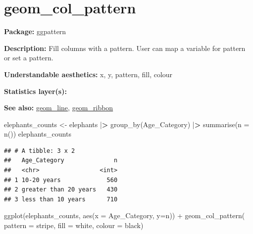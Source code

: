 \documentclass[
]{book}
\newenvironment{Shaded}{\begin{snugshade}}{\end{snugshade}}
\newcommand{\AttributeTok}[1]{\textcolor[rgb]{0.77,0.63,0.00}{#1}}
\newcommand{\ErrorTok}[1]{\textcolor[rgb]{0.64,0.00,0.00}{\textbf{#1}}}
\newcommand{\FunctionTok}[1]{\textcolor[rgb]{0.00,0.00,0.00}{#1}}
\newcommand{\NormalTok}[1]{#1}
\newcommand{\OtherTok}[1]{\textcolor[rgb]{0.56,0.35,0.01}{#1}}
\newcommand{\SpecialCharTok}[1]{\textcolor[rgb]{0.00,0.00,0.00}{#1}}
\newcommand{\StringTok}[1]{\textcolor[rgb]{0.31,0.60,0.02}{#1}}
\begin{document}
\hypertarget{col_pattern}{%
\section{geom\_col\_pattern}\label{col_pattern}}

\textbf{Package: } ggpattern \autocite{R-ggpattern}

\textbf{Description: } Fill columns with a pattern. User can map a variable for pattern or set a pattern.

\textbf{Understandable aesthetics:} x, y, pattern, fill, colour

\textbf{Statistics layer(s):}

\textbf{See also: } \protect\hyperlink{line}{geom\_line}, \protect\hyperlink{ribbon}{geom\_ribbon}

\begin{Shaded}
\begin{Highlighting}[]
\NormalTok{elephants\_counts }\OtherTok{\textless{}{-}}\NormalTok{ elephants }\SpecialCharTok{|}\ErrorTok{\textgreater{}} 
  \FunctionTok{group\_by}\NormalTok{(Age\_Category) }\SpecialCharTok{|}\ErrorTok{\textgreater{}} 
  \FunctionTok{summarise}\NormalTok{(}\AttributeTok{n =} \FunctionTok{n}\NormalTok{())}
\NormalTok{elephants\_counts}
\end{Highlighting}
\end{Shaded}

\begin{verbatim}
## # A tibble: 3 x 2
##   Age_Category              n
##   <chr>                 <int>
## 1 10-20 years             560
## 2 greater than 20 years   430
## 3 less than 10 years      710
\end{verbatim}

\begin{Shaded}
\begin{Highlighting}[]
\FunctionTok{ggplot}\NormalTok{(elephants\_counts, }\FunctionTok{aes}\NormalTok{(}\AttributeTok{x =}\NormalTok{ Age\_Category, }\AttributeTok{y=}\NormalTok{n)) }\SpecialCharTok{+} 
  \FunctionTok{geom\_col\_pattern}\NormalTok{( }\AttributeTok{pattern =} \StringTok{\textquotesingle{}stripe\textquotesingle{}}\NormalTok{,}
    \AttributeTok{fill    =} \StringTok{\textquotesingle{}white\textquotesingle{}}\NormalTok{,}
    \AttributeTok{colour  =} \StringTok{\textquotesingle{}black\textquotesingle{}}\NormalTok{)}
\end{Highlighting}
\end{Shaded}
\end{document}
